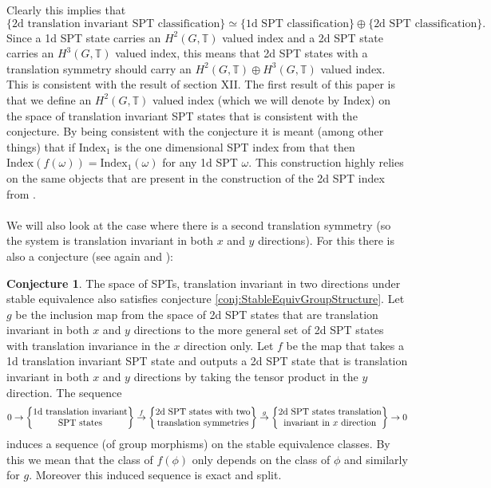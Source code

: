 \documentclass[12pt,a4paper,twoside]{article}
\let\originalleft\left
\let\originalright\right
\renewcommand{\left}{\mathopen{}\mathclose\bgroup\originalleft}
\renewcommand{\right}{\aftergroup\egroup\originalright}
\newcommand{\TT}{\mathbb T}
\theoremstyle{definition}
\newtheorem{conjecture}[theorem]{Conjecture}
\numberwithin{equation}{section}
\begin{document}
Clearly this implies that
\begin{equation}
	\{\text{2d translation invariant SPT classification}\}\simeq \{\text{1d SPT classification}\}\oplus \{\text{2d SPT classification}\}.
\end{equation}
Since a 1d SPT state carries an $H^2(G,\TT)$ valued index and a 2d SPT state carries an $H^3(G,\TT)$ valued index, this means that 2d SPT states with a translation symmetry should carry an $H^2(G,\TT)\oplus H^3(G,\TT)$ valued index. This is consistent with the result of \cite{Chen_2013} section XII.
\newpage
The first result of this paper is that we define an $H^2(G,\TT)$ valued index (which we will denote by $\textrm{Index}$) on the space of translation invariant SPT states that is consistent with the conjecture. By being consistent with the conjecture it is meant (among other things) that if $\textrm{Index}_1$ is the one dimensional SPT index from \cite{ogata2019classification} that then $\textrm{Index}(f(\omega))=\textrm{Index}_1(\omega)$ for any 1d SPT $\omega$. This construction highly relies on the same objects that are present in the construction of the 2d SPT index from \cite{ogata2021h3gmathbb}.
\\\\
We will also look at the case where there is a second translation symmetry (so the system is translation invariant in both $x$ and $y$ directions). For this there is also a conjecture (see again \cite{xiong2019classification} and \cite{Chen_2013}):
\begin{conjecture}\label{conj2}
	The space of SPTs, translation invariant in two directions under stable equivalence also satisfies conjecture \ref{conj:StableEquivGroupStructure}. Let $g$ be the inclusion map from the space of 2d SPT states that are translation invariant in both $x$ and $y$ directions to the more general set of 2d SPT states with translation invariance in the $x$ direction only. Let $f$ be the map that takes a 1d translation invariant SPT state and outputs a 2d SPT state that is translation invariant in both $x$ and $y$ directions by taking the tensor product in the $y$ direction. The sequence
	\begin{equation}
		0\rightarrow\left\{\begin{matrix}\text{1d translation invariant}\\ \text{SPT states}\end{matrix}\right\}\stackrel{f}{\rightarrow}\left\{\begin{matrix}\text{2d SPT states with two}\\ \text{translation symmetries}\end{matrix}\right\}\stackrel{g}{\rightarrow}\left\{\begin{matrix}\text{2d SPT states translation}\\ \text{invariant in $x$ direction}\end{matrix}\right\}\rightarrow 0
	\end{equation}
	induces a sequence (of group morphisms) on the stable equivalence classes. By this we mean that the class of $f(\phi)$ only depends on the class of $\phi$ and similarly for $g$. Moreover this induced sequence is exact and split.
\end{conjecture}
\end{document}

